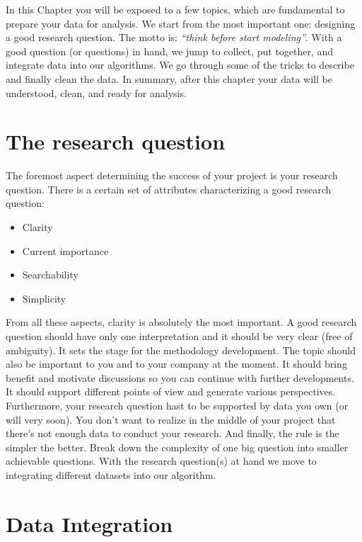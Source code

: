In this Chapter you will be exposed to a few topics, which are fundamental to prepare your data for analysis. We start from the most important one: designing a good research question. The motto is: \textit{``think before start modeling''}. With a good question (or questions) in hand, we jump to collect, put together, and integrate data into our algorithms. We go through some of the tricks to describe and finally clean the data. In summary, after this chapter your data will be understood, clean, and ready for analysis.

\section{The research question}\label{RQ}

The foremost aspect determining the success of your project is your research question. There is a certain set of attributes characterizing a good research question:

\begin{itemize}
	\item Clarity
	\item Current importance
	\item Searchability
	\item Simplicity
\end{itemize}

From all these aspects, clarity is absolutely the most important. A good research question should have only one interpretation and it should be very clear (free of ambiguity). It sets the stage for the methodology development. The topic should also be important to you and to your company at the moment. It should bring benefit and motivate discussions so you can continue with further developments. It should support different points of view and generate various perspectives. Furthermore, your research question hast to be supported by data you own (or will very soon). You don't want to realize in the middle of your project that there's not enough data to conduct your research. And finally, the rule is the simpler the better. Break down the complexity of one big question into smaller achievable questions. With the research question(s) at hand we move to integrating different datasets into our algorithm.

\section{Data Integration}\label{dataM}

